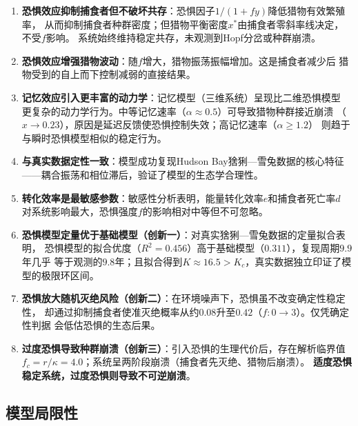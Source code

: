 \documentclass[UTF8]{ctexart}
\begin{document}
\begin{enumerate}[leftmargin=*]
    \item \textbf{恐惧效应抑制捕食者但不破坏共存}：恐惧因子$1/(1+fy)$降低猎物有效繁殖率，
    从而抑制捕食者种群密度；但猎物平衡密度$x^*$由捕食者零斜率线决定，不受$f$影响。
    系统始终维持稳定共存，未观测到Hopf分岔或种群崩溃。

    \item \textbf{恐惧效应增强猎物波动}：随$f$增大，猎物振荡振幅增加。这是捕食者减少后
    猎物受到的自上而下控制减弱的直接结果。

    \item \textbf{记忆效应引入更丰富的动力学}：记忆模型（三维系统）呈现比二维恐惧模型
    更复杂的动力学行为。中等记忆速率（$\alpha \approx 0.5$）可导致猎物种群接近崩溃
    （$x \to 0.23$），原因是延迟反馈使恐惧控制失效；高记忆速率（$\alpha \geq 1.2$）
    则趋于与瞬时恐惧模型相似的稳定行为。

    \item \textbf{与真实数据定性一致}：模型成功复现Hudson Bay猞猁—雪兔数据的核心特征
    ——耦合振荡和相位滞后，验证了模型的生态学合理性。

    \item \textbf{转化效率是最敏感参数}：敏感性分析表明，能量转化效率$e$和捕食者死亡率$d$
    对系统影响最大，恐惧强度$f$的影响相对中等但不可忽略。

    \item \textbf{恐惧模型定量优于基础模型（创新一）}：对真实猞猁—雪兔数据的定量拟合表明，
    恐惧模型的拟合优度（$R^2 = 0.456$）高于基础模型（$0.311$），复现周期$9.9$年几乎
    等于观测的$9.8$年；且拟合得到$K \approx 16.5 > K_c$，真实数据独立印证了模型的极限环区间。

    \item \textbf{恐惧放大随机灭绝风险（创新二）}：在环境噪声下，恐惧虽不改变确定性稳定性，
    却通过抑制捕食者使准灭绝概率从约$0.08$升至$0.42$（$f: 0 \to 3$）。仅凭确定性判据
    会低估恐惧的生态后果。

    \item \textbf{过度恐惧导致种群崩溃（创新三）}：引入恐惧的生理代价后，存在解析临界值
    $f_c = r/\kappa = 4.0$；系统呈两阶段崩溃（捕食者先灭绝、猎物后崩溃）。
    \textbf{适度恐惧稳定系统，过度恐惧则导致不可逆崩溃}。
\end{enumerate}

\subsection{模型局限性}
\end{document}
